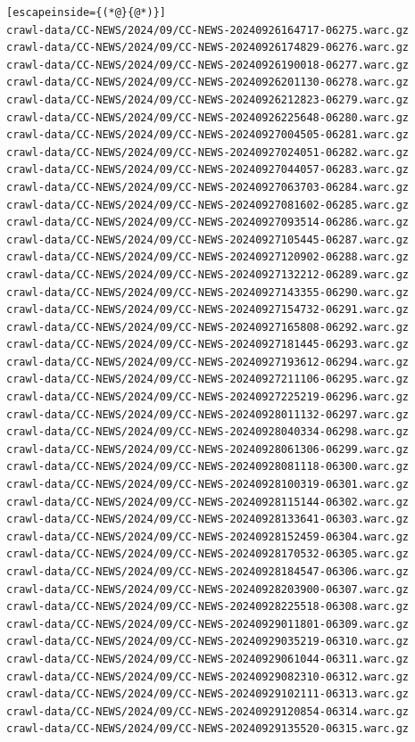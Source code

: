 \begin{lstlisting}[escapeinside={(*@}{@*)}]
crawl-data/CC-NEWS/2024/09/CC-NEWS-20240926164717-06275.warc.gz
crawl-data/CC-NEWS/2024/09/CC-NEWS-20240926174829-06276.warc.gz
crawl-data/CC-NEWS/2024/09/CC-NEWS-20240926190018-06277.warc.gz
crawl-data/CC-NEWS/2024/09/CC-NEWS-20240926201130-06278.warc.gz
crawl-data/CC-NEWS/2024/09/CC-NEWS-20240926212823-06279.warc.gz
crawl-data/CC-NEWS/2024/09/CC-NEWS-20240926225648-06280.warc.gz
crawl-data/CC-NEWS/2024/09/CC-NEWS-20240927004505-06281.warc.gz
crawl-data/CC-NEWS/2024/09/CC-NEWS-20240927024051-06282.warc.gz
crawl-data/CC-NEWS/2024/09/CC-NEWS-20240927044057-06283.warc.gz
crawl-data/CC-NEWS/2024/09/CC-NEWS-20240927063703-06284.warc.gz
crawl-data/CC-NEWS/2024/09/CC-NEWS-20240927081602-06285.warc.gz
crawl-data/CC-NEWS/2024/09/CC-NEWS-20240927093514-06286.warc.gz
crawl-data/CC-NEWS/2024/09/CC-NEWS-20240927105445-06287.warc.gz
crawl-data/CC-NEWS/2024/09/CC-NEWS-20240927120902-06288.warc.gz
crawl-data/CC-NEWS/2024/09/CC-NEWS-20240927132212-06289.warc.gz
crawl-data/CC-NEWS/2024/09/CC-NEWS-20240927143355-06290.warc.gz
crawl-data/CC-NEWS/2024/09/CC-NEWS-20240927154732-06291.warc.gz
crawl-data/CC-NEWS/2024/09/CC-NEWS-20240927165808-06292.warc.gz
crawl-data/CC-NEWS/2024/09/CC-NEWS-20240927181445-06293.warc.gz
crawl-data/CC-NEWS/2024/09/CC-NEWS-20240927193612-06294.warc.gz
crawl-data/CC-NEWS/2024/09/CC-NEWS-20240927211106-06295.warc.gz
crawl-data/CC-NEWS/2024/09/CC-NEWS-20240927225219-06296.warc.gz
crawl-data/CC-NEWS/2024/09/CC-NEWS-20240928011132-06297.warc.gz
crawl-data/CC-NEWS/2024/09/CC-NEWS-20240928040334-06298.warc.gz
crawl-data/CC-NEWS/2024/09/CC-NEWS-20240928061306-06299.warc.gz
crawl-data/CC-NEWS/2024/09/CC-NEWS-20240928081118-06300.warc.gz
crawl-data/CC-NEWS/2024/09/CC-NEWS-20240928100319-06301.warc.gz
crawl-data/CC-NEWS/2024/09/CC-NEWS-20240928115144-06302.warc.gz
crawl-data/CC-NEWS/2024/09/CC-NEWS-20240928133641-06303.warc.gz
crawl-data/CC-NEWS/2024/09/CC-NEWS-20240928152459-06304.warc.gz
crawl-data/CC-NEWS/2024/09/CC-NEWS-20240928170532-06305.warc.gz
crawl-data/CC-NEWS/2024/09/CC-NEWS-20240928184547-06306.warc.gz
crawl-data/CC-NEWS/2024/09/CC-NEWS-20240928203900-06307.warc.gz
crawl-data/CC-NEWS/2024/09/CC-NEWS-20240928225518-06308.warc.gz
crawl-data/CC-NEWS/2024/09/CC-NEWS-20240929011801-06309.warc.gz
crawl-data/CC-NEWS/2024/09/CC-NEWS-20240929035219-06310.warc.gz
crawl-data/CC-NEWS/2024/09/CC-NEWS-20240929061044-06311.warc.gz
crawl-data/CC-NEWS/2024/09/CC-NEWS-20240929082310-06312.warc.gz
crawl-data/CC-NEWS/2024/09/CC-NEWS-20240929102111-06313.warc.gz
crawl-data/CC-NEWS/2024/09/CC-NEWS-20240929120854-06314.warc.gz
crawl-data/CC-NEWS/2024/09/CC-NEWS-20240929135520-06315.warc.gz

\end{lstlisting}
